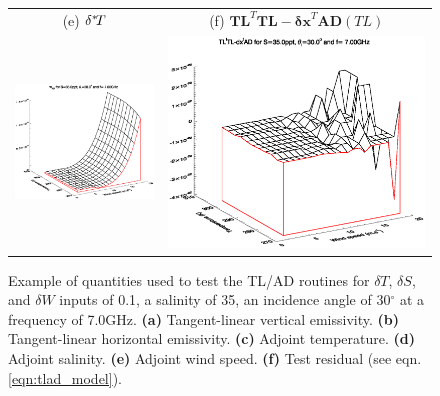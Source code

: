 \begin{figure}[htp]
\begin{tabular}{c c}
    \textsf{(e)} $\delta^{*}\! T$ &
    \textsf{(f)} $\mathbf{TL}^{T}\mathbf{TL} - \mathbf{\delta x}^{T}\mathbf{AD}(TL)$ \\
    \includegraphics[bb=110 240 508 540,clip,scale=0.5]{graphics/Model/TLAD/w_AD_s35.0ppt_z30.0_7.00GHz.eps} & 
    \includegraphics[bb=110 240 508 540,clip,scale=0.5]{graphics/Model/TLAD/TLtTL-dxtAD_s35.0ppt_z30.0_7.00GHz.eps}
  \end{tabular}
  \caption{Example of quantities used to test the TL/AD routines for $\delta{T}$, $\delta{S}$, and $\delta{W}$ inputs of 0.1, a salinity of 35\textperthousand, an incidence angle of 30$^{\circ}$ at a frequency of 7.0GHz. \textbf{(a)} Tangent-linear vertical emissivity. \textbf{(b)} Tangent-linear horizontal emissivity. \textbf{(c)} Adjoint temperature.  \textbf{(d)} Adjoint salinity. \textbf{(e)} Adjoint wind speed. \textbf{(f)} Test residual (see eqn.\ref{eqn:tlad_model}).}
  \label{fig:tlad_s35.0ppt_z30.0_7.00GHz}
\end{figure}


